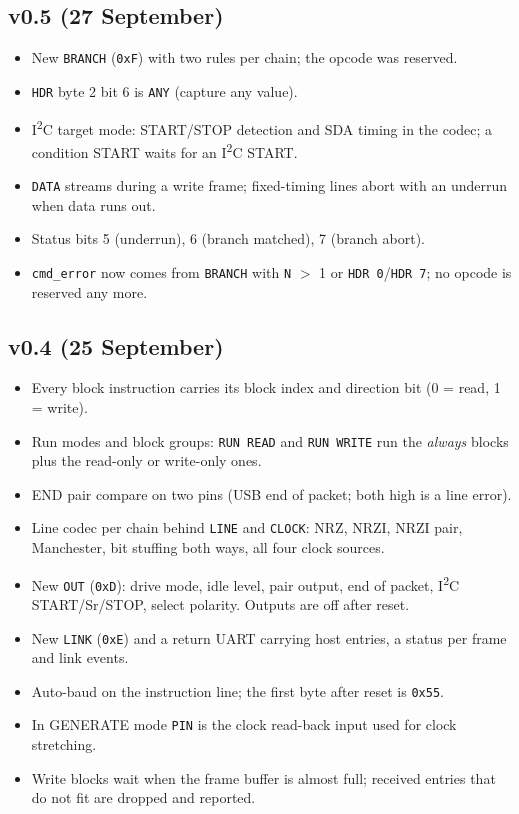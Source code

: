\documentclass[11pt,a4paper]{article}
\newcommand{\sig}[1]{\texttt{#1}}
\begin{document}
\subsection{v0.5 (27 September)}

\begin{itemize}
\item New \sig{BRANCH} (\texttt{0xF}) with two rules per chain; the opcode was reserved.
\item \sig{HDR} byte 2 bit 6 is \sig{ANY} (capture any value).
\item I\textsuperscript{2}C target mode: START/STOP detection and SDA timing in the codec; a condition START waits for an I\textsuperscript{2}C START.
\item \sig{DATA} streams during a write frame; fixed-timing lines abort with an underrun when data runs out.
\item Status bits 5 (underrun), 6 (branch matched), 7 (branch abort).
\item \sig{cmd\_error} now comes from \sig{BRANCH} with \sig{N} $>$ 1 or \sig{HDR 0}/\sig{HDR 7}; no opcode is reserved any more.
\end{itemize}

\subsection{v0.4 (25 September)}\label{sec:changes}

\begin{itemize}
\item Every block instruction carries its block index and direction bit (0 = read, 1 = write).
\item Run modes and block groups: \sig{RUN READ} and \sig{RUN WRITE} run the \emph{always} blocks plus the read-only or write-only ones.
\item END pair compare on two pins (USB end of packet; both high is a line error).
\item Line codec per chain behind \sig{LINE} and \sig{CLOCK}: NRZ, NRZI, NRZI pair, Manchester, bit stuffing both ways, all four clock sources.
\item New \sig{OUT} (\texttt{0xD}): drive mode, idle level, pair output, end of packet, I\textsuperscript{2}C START/Sr/STOP, select polarity. Outputs are off after reset.
\item New \sig{LINK} (\texttt{0xE}) and a return UART carrying host entries, a status per frame and link events.
\item Auto-baud on the instruction line; the first byte after reset is \texttt{0x55}.
\item In GENERATE mode \sig{PIN} is the clock read-back input used for clock stretching.
\item Write blocks wait when the frame buffer is almost full; received entries that do not fit are dropped and reported.
\end{itemize}
\end{document}
